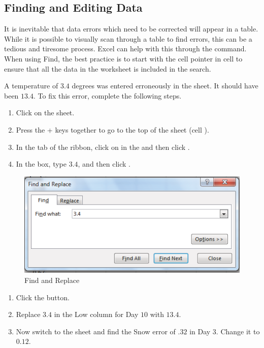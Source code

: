 \subsection{Finding and Editing Data}

It is inevitable that data errors which need to be corrected will appear in a table. While it is possible to visually scan through a table to find errors, this can be a tedious and tiresome process. Excel can help with this through the  command. When using Find, the best practice is to start with the cell pointer in cell  to ensure that all the data in the worksheet is included in the search.

A temperature of $ 3.4 $ degrees was entered erroneously in the  sheet. It should have been $ 13.4 $. To fix this error, complete the following steps.

\begin{enumerate}
	\item Click on the  sheet.
	\item Press the + keys together to go to the top of the sheet (cell ).
	\item In the  tab of the ribbon, click on  in the  and then click .
	\item In the  box, type $ 3.4 $, and then click .
\end{enumerate}

\begin{figure}[H]
	\centering
	\includegraphics[width=\maxwidth{.95\linewidth}]{gfx/ch05_fig06}
	\caption{Find and Replace}
	\label{05:fig06}
\end{figure}

\begin{enumerate}
	\item Click the  button.
	\item Replace $ 3.4 $ in the Low column for Day $ 10 $ with $ 13.4 $.
	\item Now switch to the  sheet and find the Snow error of $ .32 $ in Day $ 3 $. Change it to $ 0.12 $. 
\end{enumerate}

